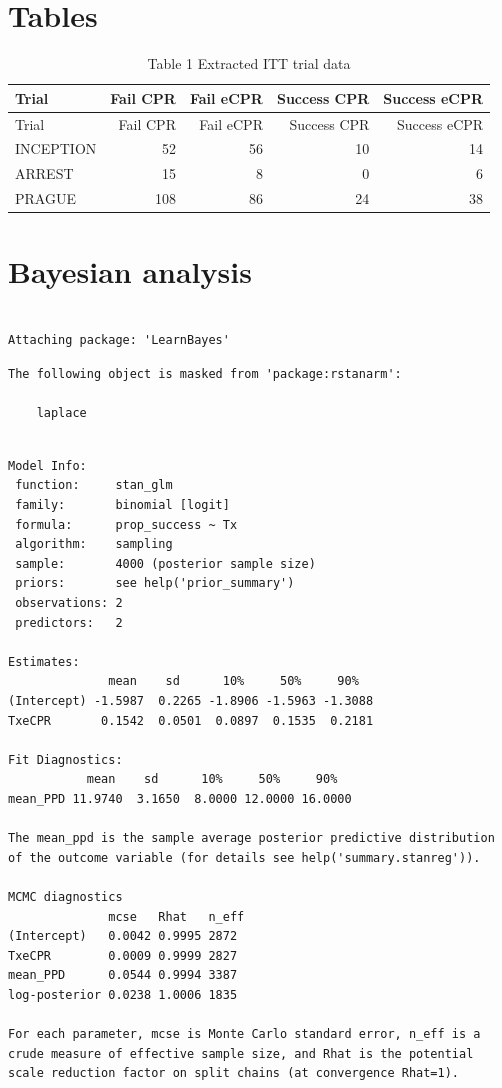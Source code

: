 \documentclass[
  super,
  preprint,
  3p]{elsarticle}
\begin{document}
\newpage

\hypertarget{tables}{%
\section{Tables}\label{tables}}

\begin{longtable}[]{@{}lrrrr@{}}
\caption{Table 1 Extracted ITT trial data}\tabularnewline
\toprule()
Trial & Fail CPR & Fail eCPR & Success CPR & Success eCPR \\
\midrule()
\endfirsthead
\toprule()
Trial & Fail CPR & Fail eCPR & Success CPR & Success eCPR \\
\midrule()
\endhead
INCEPTION & 52 & 56 & 10 & 14 \\
ARREST & 15 & 8 & 0 & 6 \\
PRAGUE & 108 & 86 & 24 & 38 \\
\bottomrule()
\end{longtable}

\hypertarget{bayesian-analysis}{%
\section{Bayesian analysis}\label{bayesian-analysis}}

\begin{verbatim}

Attaching package: 'LearnBayes'
\end{verbatim}

\begin{verbatim}
The following object is masked from 'package:rstanarm':

    laplace
\end{verbatim}

\begin{verbatim}

Model Info:
 function:     stan_glm
 family:       binomial [logit]
 formula:      prop_success ~ Tx
 algorithm:    sampling
 sample:       4000 (posterior sample size)
 priors:       see help('prior_summary')
 observations: 2
 predictors:   2

Estimates:
              mean    sd      10%     50%     90%  
(Intercept) -1.5987  0.2265 -1.8906 -1.5963 -1.3088
TxeCPR       0.1542  0.0501  0.0897  0.1535  0.2181

Fit Diagnostics:
           mean    sd      10%     50%     90%  
mean_PPD 11.9740  3.1650  8.0000 12.0000 16.0000

The mean_ppd is the sample average posterior predictive distribution of the outcome variable (for details see help('summary.stanreg')).

MCMC diagnostics
              mcse   Rhat   n_eff
(Intercept)   0.0042 0.9995 2872 
TxeCPR        0.0009 0.9999 2827 
mean_PPD      0.0544 0.9994 3387 
log-posterior 0.0238 1.0006 1835 

For each parameter, mcse is Monte Carlo standard error, n_eff is a crude measure of effective sample size, and Rhat is the potential scale reduction factor on split chains (at convergence Rhat=1).
\end{verbatim}
\end{document}
